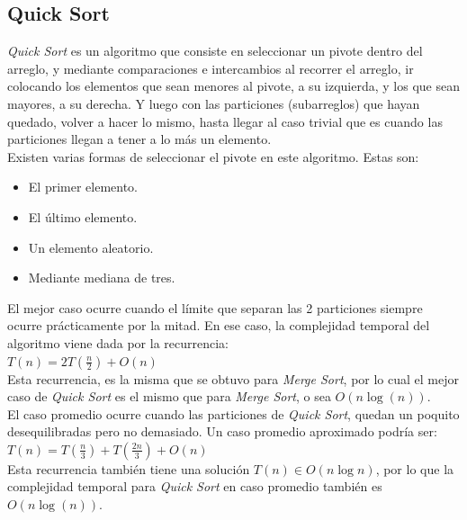 \subsection{Quick Sort}

\textit{Quick Sort} es un algoritmo que consiste en seleccionar un pivote dentro del arreglo, y mediante comparaciones e intercambios al recorrer el arreglo, 
ir colocando los elementos que sean menores al pivote, a su izquierda, y los que sean mayores, a su derecha.  Y luego con las particiones (subarreglos) que 
hayan quedado, volver a hacer lo mismo, hasta llegar al caso trivial que es cuando las particiones llegan a tener a lo más un elemento. \\

Existen varias formas de seleccionar el pivote en este algoritmo.  Estas son:  

\begin{itemize}
    \item El primer elemento.
    \item El último elemento.
    \item Un elemento aleatorio.
    \item Mediante mediana de tres.
\end{itemize}

El mejor caso ocurre cuando el límite que separan las 2 particiones siempre ocurre prácticamente por la mitad.  En ese caso, la complejidad temporal del
algoritmo viene dada por la recurrencia: \\

$T(n) = 2T(\frac{n}{2}) + O(n)$ \\

Esta recurrencia, es la misma que se obtuvo para \textit{Merge Sort}, por lo cual el mejor caso de \textit{Quick Sort} es el mismo que para \textit{Merge Sort}, o sea
$O(n \log(n))$. \\

El caso promedio ocurre cuando las particiones de \textit{Quick Sort}, quedan un poquito desequilibradas pero no demasiado.  Un caso promedio aproximado podría ser: \\

$T(n) = T(\frac{n}{3}) + T(\frac{2n}{3}) + O(n)$ \\

Esta recurrencia también tiene una solución $T(n) \in O(n \log n)$, por lo que la complejidad temporal para \textit{Quick Sort} en caso promedio también es 
$O(n \log(n))$. \\


